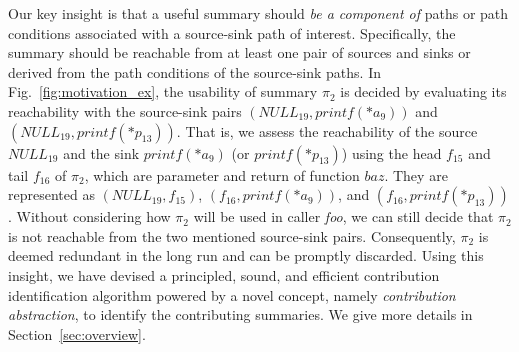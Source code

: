 Our key insight is that a useful summary should \emph{be a component of} paths or path conditions associated with a source-sink path of interest.
Specifically, the summary should be reachable from at least one pair of sources and sinks or derived from the path conditions of the source-sink paths.
\sloppy
In Fig.~\ref{fig:motivation_ex}, the usability of summary $\pi_2$ is decided by evaluating its reachability with the source-sink pairs $(NULL_{19}, printf(*a_9))$ and $(NULL_{19}, printf(*p_{13}))$. 
That is, we assess the reachability of the source $NULL_{19}$ and the sink $printf(*a_9)$ (or $printf(*p_{13})$) using the head $f_{15}$ and tail $f_{16}$ of $\pi_2$, which are parameter and return of function $baz$. 
They are represented as $(NULL_{19}, f_{15})$, $(f_{16}, printf(*a_9))$, and $(f_{16}, printf(*p_{13}))$.
Without considering how $\pi_2$ will be used in caller \textit{foo}, we can still decide that $\pi_2$ is not reachable from the two mentioned source-sink pairs. 
Consequently, $\pi_2$ is deemed redundant in the long run and can be promptly discarded.
Using this insight, we have devised a principled, sound, and efficient contribution identification algorithm powered by a novel concept, namely \textit{contribution abstraction}, to identify the contributing summaries.
We give more details in Section~\ref{sec:overview}.



